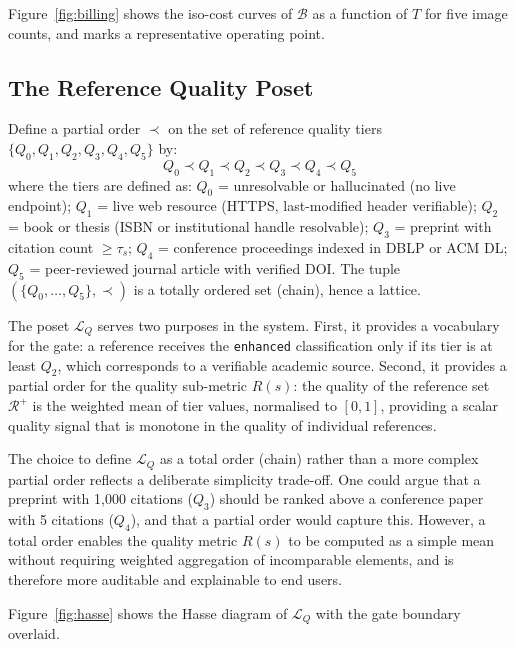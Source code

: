 Figure~\ref{fig:billing} shows the iso-cost curves of $\mathcal{B}$ as a function of $T$
for five image counts, and marks a representative operating point.



\subsection{The Reference Quality Poset}

\begin{definition}
\label{def:quality_poset}
Define a partial order $\prec$ on the set of reference quality tiers
$\{Q_0,Q_1,Q_2,Q_3,Q_4,Q_5\}$ by:
\[
  Q_0 \prec Q_1 \prec Q_2 \prec Q_3 \prec Q_4 \prec Q_5
\]
where the tiers are defined as:
$Q_0$ = unresolvable or hallucinated (no live endpoint);
$Q_1$ = live web resource (HTTPS, last-modified header verifiable);
$Q_2$ = book or thesis (ISBN or institutional handle resolvable);
$Q_3$ = preprint with citation count $\geq\tau_s$;
$Q_4$ = conference proceedings indexed in DBLP or ACM DL;
$Q_5$ = peer-reviewed journal article with verified DOI.
The tuple $(\{Q_0,\ldots,Q_5\},\prec)$ is a totally ordered set (chain), hence a lattice.
\end{definition}

The poset $\mathcal{L}_Q$ serves two purposes in the system.
First, it provides a vocabulary for the \cgrag{} gate: a reference receives the
\texttt{enhanced} classification only if its tier is at least $Q_2$, which corresponds
to a verifiable academic source.
Second, it provides a partial order for the quality sub-metric $R(s)$: the quality
of the reference set $\mathcal{R}^+$ is the weighted mean of tier values, normalised
to $[0,1]$, providing a scalar quality signal that is monotone in the quality of
individual references.

The choice to define $\mathcal{L}_Q$ as a total order (chain) rather than a more
complex partial order reflects a deliberate simplicity trade-off.
One could argue that a preprint with 1,000 citations ($Q_3$) should be ranked above
a conference paper with 5 citations ($Q_4$), and that a partial order would capture this.
However, a total order enables the quality metric $R(s)$ to be computed as a simple mean
without requiring weighted aggregation of incomparable elements, and is therefore more
auditable and explainable to end users.

Figure~\ref{fig:hasse} shows the Hasse diagram of $\mathcal{L}_Q$ with the \cgrag{}
gate boundary overlaid.

